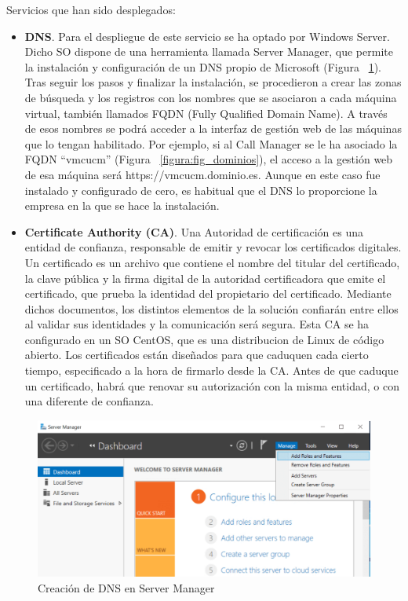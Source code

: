 \documentclass[a4paper, 12pt]{book}
\begin{document}
Servicios que han sido desplegados:
\begin{itemize}
  \item \textbf{DNS}. Para el despliegue de este servicio se ha optado por Windows Server. Dicho SO dispone de una herramienta llamada Server Manager, que permite la instalación y configuración de un DNS propio de Microsoft (Figura ~\ref{figura:fig_dns}). Tras seguir los pasos y finalizar la instalación, se procedieron a crear las zonas de búsqueda y los registros con los nombres que se asociaron a cada máquina virtual, también llamados FQDN (Fully Qualified Domain Name). A través de esos nombres se podrá acceder a la interfaz de gestión web de las máquinas que lo tengan habilitado. Por ejemplo, si al Call Manager se le ha asociado la FQDN ``vmcucm'' (Figura ~\ref{figura:fig_dominios}), el acceso a la gestión web de esa máquina será https://vmcucm.dominio.es. Aunque en este caso fue instalado y configurado de cero, es habitual que el DNS lo proporcione la empresa en la que se hace la instalación.
  \item \textbf{Certificate Authority (CA)}. Una Autoridad de certificación es una entidad de confianza, responsable de emitir y revocar los certificados digitales. Un certificado es un archivo que contiene el nombre del titular del certificado, la clave pública y la firma digital de la autoridad certificadora que emite el certificado, que prueba la identidad del propietario del certificado. 
  Mediante dichos documentos, los distintos elementos de la solución confiarán entre ellos al validar sus identidades y la comunicación será segura.
  Esta CA se ha configurado en un SO CentOS, que es una distribucion de Linux de código abierto.
  Los certificados están diseñados para que caduquen cada cierto tiempo, especificado a la hora de firmarlo desde la CA. Antes de que caduque un certificado, habrá que renovar su autorización con la misma entidad, o con una diferente de confianza.
\end{itemize}

\begin{figure}
  \centering
  \includegraphics[scale=0.85]{img/fig_dns}
  \caption{Creación de DNS en Server Manager}
  \label{figura:fig_dns}
\end{figure}
\end{document}
